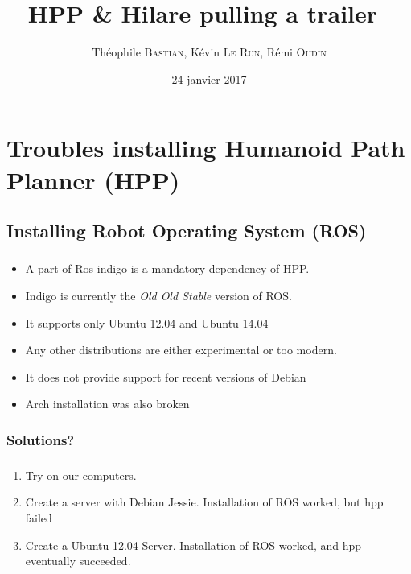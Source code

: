 \documentclass[11pt]{beamer}
\author{Théophile \textsc{Bastian}, Kévin \textsc{Le Run}, Rémi \textsc{Oudin}}
\title{HPP \& \og{}Hilare pulling a trailer~\fg}
\date{24 janvier 2017}
\begin{document}
\begin{frame}
	\titlepage{}
	\tableofcontents
\end{frame}


\section{Troubles installing Humanoid Path Planner (HPP)}

\subsection{Installing Robot Operating System (ROS)}

\begin{frame}
    \frametitle{\subsecname}
    \begin{itemize}
        \item A part of Ros-indigo is a mandatory dependency of HPP.\\
        \item Indigo is currently the \emph{Old Old Stable} version of ROS.
        \item It supports only Ubuntu 12.04 and Ubuntu 14.04
        \item Any other distributions are either experimental or too modern.
        \item It does not provide support for recent versions of Debian
        \item Arch installation was also broken
    \end{itemize}
\end{frame}

\subsubsection{Solutions?}

\begin{frame}
    \frametitle{\subsecname}
    \begin{enumerate}
        \item Try on our computers.
        \item Create a server with Debian Jessie. Installation of ROS worked,
            but hpp failed
        \item Create a Ubuntu 12.04 Server. Installation of ROS worked,
            and hpp eventually succeeded.
    \end{enumerate}
\end{frame}
\end{document}
